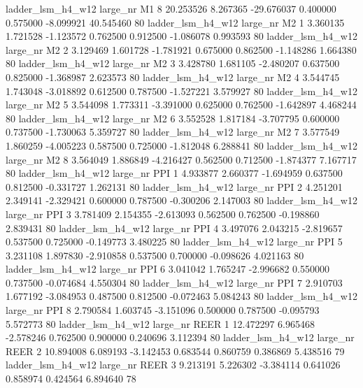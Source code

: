   ladder_lsm_h4_w12   large_nr       M1                 8 20.253526  8.267365 -29.676037 0.400000 0.575000 -8.099921   40.545460 80
  ladder_lsm_h4_w12   large_nr       M2                 1  3.360135  1.721528  -1.123572 0.762500 0.912500 -1.086078    0.993593 80
  ladder_lsm_h4_w12   large_nr       M2                 2  3.129469  1.601728  -1.781921 0.675000 0.862500 -1.148286    1.664380 80
  ladder_lsm_h4_w12   large_nr       M2                 3  3.428780  1.681105  -2.480207 0.637500 0.825000 -1.368987    2.623573 80
  ladder_lsm_h4_w12   large_nr       M2                 4  3.544745  1.743048  -3.018892 0.612500 0.787500 -1.527221    3.579927 80
  ladder_lsm_h4_w12   large_nr       M2                 5  3.544098  1.773311  -3.391000 0.625000 0.762500 -1.642897    4.468244 80
  ladder_lsm_h4_w12   large_nr       M2                 6  3.552528  1.817184  -3.707795 0.600000 0.737500 -1.730063    5.359727 80
  ladder_lsm_h4_w12   large_nr       M2                 7  3.577549  1.860259  -4.005223 0.587500 0.725000 -1.812048    6.288841 80
  ladder_lsm_h4_w12   large_nr       M2                 8  3.564049  1.886849  -4.216427 0.562500 0.712500 -1.874377    7.167717 80
  ladder_lsm_h4_w12   large_nr      PPI                 1  4.933877  2.660377  -1.694959 0.637500 0.812500 -0.331727    1.262131 80
  ladder_lsm_h4_w12   large_nr      PPI                 2  4.251201  2.349141  -2.329421 0.600000 0.787500 -0.300206    2.147003 80
  ladder_lsm_h4_w12   large_nr      PPI                 3  3.781409  2.154355  -2.613093 0.562500 0.762500 -0.198860    2.839431 80
  ladder_lsm_h4_w12   large_nr      PPI                 4  3.497076  2.043215  -2.819657 0.537500 0.725000 -0.149773    3.480225 80
  ladder_lsm_h4_w12   large_nr      PPI                 5  3.231108  1.897830  -2.910858 0.537500 0.700000 -0.098626    4.021163 80
  ladder_lsm_h4_w12   large_nr      PPI                 6  3.041042  1.765247  -2.996682 0.550000 0.737500 -0.074684    4.550304 80
  ladder_lsm_h4_w12   large_nr      PPI                 7  2.910703  1.677192  -3.084953 0.487500 0.812500 -0.072463    5.084243 80
  ladder_lsm_h4_w12   large_nr      PPI                 8  2.790584  1.603745  -3.151096 0.500000 0.787500 -0.095793    5.572773 80
  ladder_lsm_h4_w12   large_nr     REER                 1 12.472297  6.965468  -2.578246 0.762500 0.900000  0.240696    3.112394 80
  ladder_lsm_h4_w12   large_nr     REER                 2 10.894008  6.089193  -3.142453 0.683544 0.860759  0.386869    5.438516 79
  ladder_lsm_h4_w12   large_nr     REER                 3  9.213191  5.226302  -3.384114 0.641026 0.858974  0.424564    6.894640 78

